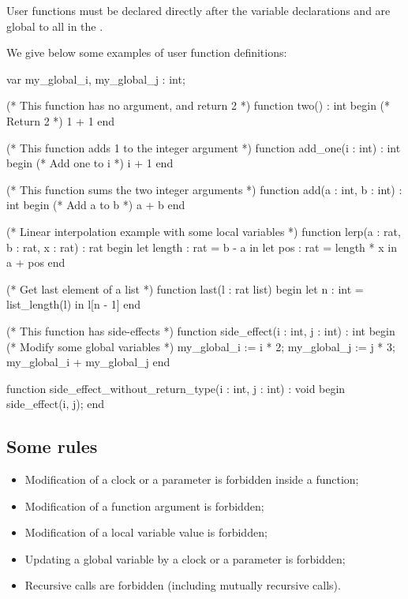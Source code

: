 User functions must be declared directly after the variable declarations and are global to all \IPTA{} in the \NIPTA{}.

\begin{example}
We give below some examples of user function definitions:

\begin{IMITATORmodel}
	var
		my_global_i, my_global_j : int;

	(* This function has no argument, and return 2 *)
	function two() : int
	begin
		(* Return 2 *)
		1 + 1
	end

	(* This function adds 1 to the integer argument *)
	function add_one(i : int) : int
	begin
		(* Add one to i *)
		i + 1
	end

	(* This function sums the two integer arguments *)
	function add(a : int, b : int) : int
	begin
		(* Add a to b *)
		a + b
	end

	(* Linear interpolation example with some local variables *)
	function lerp(a : rat, b : rat, x : rat) : rat
	begin
		let length : rat = b - a in
		let pos : rat = length * x in
		a + pos
	end

	(* Get last element of a list *)
	function last(l : rat list)
	begin
		let n : int = list_length(l) in
		l[n - 1]
	end

	(* This function has side-effects *)
	function side_effect(i : int, j : int) : int
	begin
		(* Modify some global variables *)
		my_global_i := i * 2;
		my_global_j := j * 3;
		my_global_i + my_global_j
	end

	function side_effect_without_return_type(i : int, j : int) : void
	begin
		side_effect(i, j);
	end

\end{IMITATORmodel}
\end{example}

\subsection{Some rules}

\begin{itemize}
	\item Modification of a clock or a parameter is forbidden inside a function;
	\item Modification of a function argument is forbidden;
	\item Modification of a local variable value is forbidden;
	\item Updating a global variable by a clock or a parameter is forbidden;
	\item Recursive calls are forbidden (including mutually recursive calls).
\end{itemize}

